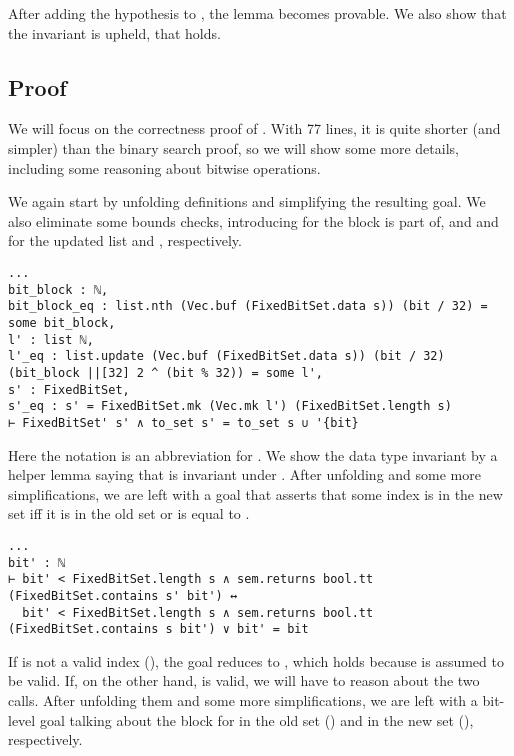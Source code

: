 After adding the hypothesis \lean{[FixedBitSet' s]} to , the
lemma becomes provable. We also show that the invariant is upheld, \ie that
 holds.

\subsection{Proof}

We will focus on the correctness proof of . With 77 lines, it is
quite shorter (and simpler) than the binary search proof, so we will show some
more details, including some reasoning about bitwise operations.

We again start by unfolding definitions and simplifying the resulting goal. We
also eliminate some bounds checks, introducing  for the  block
 is part of, and  and  for the updated list and
, respectively.

\begin{verbatim}
...
bit_block : ℕ,
bit_block_eq : list.nth (Vec.buf (FixedBitSet.data s)) (bit / 32) = some bit_block,
l' : list ℕ,
l'_eq : list.update (Vec.buf (FixedBitSet.data s)) (bit / 32) (bit_block ||[32] 2 ^ (bit % 32)) = some l',
s' : FixedBitSet,
s'_eq : s' = FixedBitSet.mk (Vec.mk l') (FixedBitSet.length s)
⊢ FixedBitSet' s' ∧ to_set s' = to_set s ∪ '{bit}
\end{verbatim}

Here the notation \lean{||[32]} is an abbreviation for . We show the data type invariant by a helper lemma saying that
 is invariant under . After unfolding
 and some more simplifications, we are left with a
goal that asserts that some index  is in the new set iff it is in
the old set or is equal to .

\begin{verbatim}
...
bit' : ℕ
⊢ bit' < FixedBitSet.length s ∧ sem.returns bool.tt (FixedBitSet.contains s' bit') ↔
  bit' < FixedBitSet.length s ∧ sem.returns bool.tt (FixedBitSet.contains s bit') ∨ bit' = bit
\end{verbatim}

If  is not a valid index (), the
goal reduces to , which holds because  is assumed to
be valid. If, on the other hand,  is valid, we will have to reason
about the two  calls. After unfolding them and some more
simplifications, we are left with a bit-level goal talking about the
 block for  in the old set () and in the
new set (), respectively.

